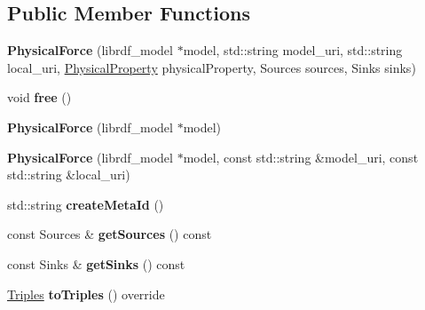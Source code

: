\subsection*{Public Member Functions}
\begin{DoxyCompactItemize}
\item 
\mbox{\label{classomexmeta_1_1PhysicalForce_a8761d703a67c6dc81b4a71b90391b20f}} 
{\bfseries Physical\+Force} (librdf\+\_\+model $\ast$model, std\+::string model\+\_\+uri, std\+::string local\+\_\+uri, \hyperlink{classomexmeta_1_1PhysicalProperty}{Physical\+Property} physical\+Property, Sources sources, Sinks sinks)
\item 
\mbox{\label{classomexmeta_1_1PhysicalForce_a41cd6c9904f3287bb8cbbab2b9d2ada3}} 
void {\bfseries free} ()
\item 
\mbox{\label{classomexmeta_1_1PhysicalForce_a673e6810fe969bcd087ab88c62e5e041}} 
{\bfseries Physical\+Force} (librdf\+\_\+model $\ast$model)
\item 
\mbox{\label{classomexmeta_1_1PhysicalForce_a2ff9aecd73a5356be701d8ba7e9bf71c}} 
{\bfseries Physical\+Force} (librdf\+\_\+model $\ast$model, const std\+::string \&model\+\_\+uri, const std\+::string \&local\+\_\+uri)
\item 
\mbox{\label{classomexmeta_1_1PhysicalForce_ae0a9ec4689b4765d985ab8f7a8878f38}} 
std\+::string {\bfseries create\+Meta\+Id} ()
\item 
\mbox{\label{classomexmeta_1_1PhysicalForce_aa42b8e04573d2ae88f952c76b146d5ac}} 
const Sources \& {\bfseries get\+Sources} () const
\item 
\mbox{\label{classomexmeta_1_1PhysicalForce_ab37bbe3a0f762066fdb43e5c2ce608eb}} 
const Sinks \& {\bfseries get\+Sinks} () const
\item 
\mbox{\label{classomexmeta_1_1PhysicalForce_a39dd511aee85130d07cb6ffb3f8e87f0}} 
\hyperlink{classomexmeta_1_1Triples}{Triples} {\bfseries to\+Triples} () override
\item 

\end{DoxyCompactItemize}
